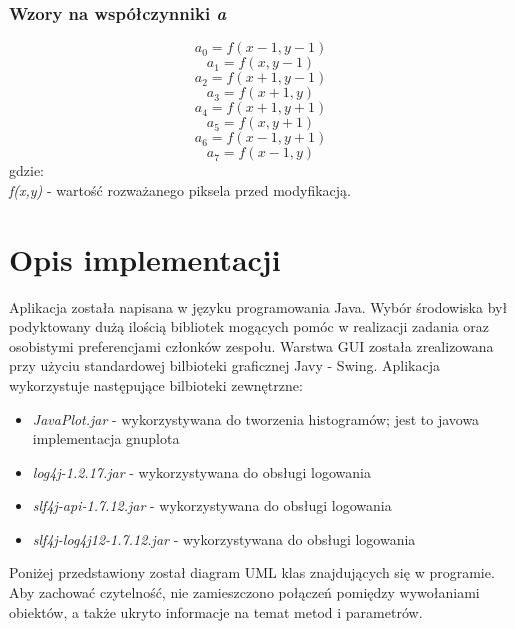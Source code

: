 \documentclass{classrep}
\begin{document}
\subsubsection{Wzory na współczynniki \textit{a}}
\[ a_0 = f(x - 1, y - 1)\]
\[ a_1 = f(x, y - 1)\]
\[ a_2 = f(x + 1, y - 1)\]
\[ a_3 = f(x + 1, y)\]
\[ a_4 = f(x + 1, y + 1)\]
\[ a_5 = f(x, y + 1)\]
\[ a_6 = f(x - 1, y + 1)\]
\[ a_7 = f(x - 1, y)\]
gdzie:\\
\textit{f(x,y)} - wartość rozważanego piksela przed modyfikacją.\\

\section{Opis implementacji}
Aplikacja została napisana w języku programowania Java. Wybór środowiska był podyktowany dużą ilością bibliotek mogących pomóc w realizacji zadania oraz osobistymi preferencjami członków zespołu. Warstwa GUI została zrealizowana przy użyciu standardowej bilbioteki graficznej Javy - Swing. Aplikacja wykorzystuje następujące bilbioteki zewnętrzne:
\begin{itemize}
\item \textit{JavaPlot.jar} - wykorzystywana do tworzenia histogramów; jest to javowa implementacja gnuplota 
\item \textit{log4j-1.2.17.jar} - wykorzystywana do obsługi logowania
\item \textit{slf4j-api-1.7.12.jar} - wykorzystywana do obsługi logowania
\item \textit{slf4j-log4j12-1.7.12.jar} - wykorzystywana do obsługi logowania
\end{itemize}

Poniżej przedstawiony został diagram UML klas znajdujących się w programie. Aby zachować czytelność, nie zamieszczono połączeń pomiędzy wywołaniami obiektów, a także ukryto informacje na temat metod i parametrów.
\end{document}

